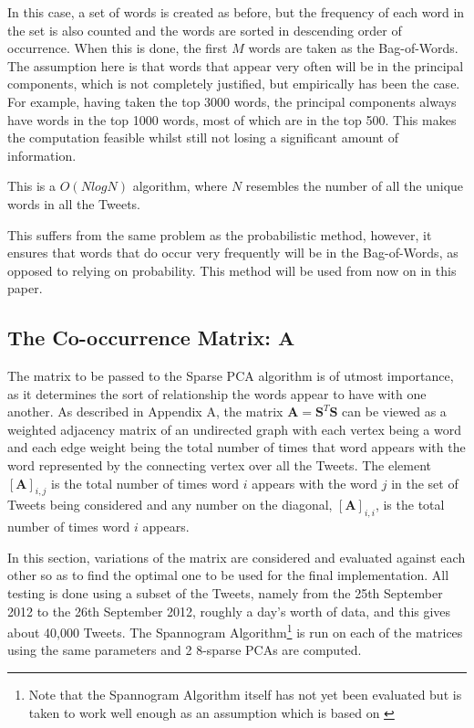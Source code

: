 \documentclass[11pt,a4paper]{article}
\newcommand{\covmat}{\mathbf{A}}
\begin{document}
In this case, a set of words is created as before, but the frequency of each word in the set is also counted and the words are sorted in descending order of occurrence. When this is done, the first $M$ words are taken as the Bag-of-Words. The assumption here is that words that appear very often will be in the principal components, which is not completely justified, but empirically has been the case. For example, having taken the top 3000 words, the principal components always have words in the top 1000 words, most of which are in the top 500. This makes the computation feasible whilst still not losing a significant amount of information.

This is a $O(NlogN)$ algorithm, where $N$ resembles the number of all the unique words in all the Tweets. 

This suffers from the same problem as the probabilistic method, however, it ensures that words that do occur very frequently will be in the Bag-of-Words, as opposed to relying on probability. This method will be used from now on in this paper.

\subsection{The Co-occurrence Matrix: $\mathbf{A}$}
\label{covmat}
The matrix to be passed to the Sparse PCA algorithm is of utmost importance, as it determines the sort of relationship the words appear to have with one another. As described in Appendix A, the matrix $\mathbf{A} = \mathbf{S}^T \mathbf{S}$ can be viewed as a weighted adjacency matrix of an undirected graph with each vertex being a word and each edge weight being the total number of times that word appears with the word represented by the connecting vertex over all the Tweets. The element $[\covmat]_{i, j}$ is the total number of times word $i$ appears with the word $j$ in the set of Tweets being considered and any number on the diagonal, $[\covmat]_{i, i}$, is the total number of times word $i$ appears. 

In this section, variations of the matrix are considered and evaluated against each other so as to find the optimal one to be used for the final implementation. All testing is done using a subset of the Tweets, namely from the 25th September 2012 to the 26th September 2012, roughly a day's worth of data, and this gives about 40,000 Tweets. The Spannogram Algorithm\footnote{Note that the Spannogram Algorithm itself has not yet been evaluated but is taken to work well enough as an assumption which is based on \cite{dimakis}} is run on each of the matrices using the same parameters and 2 8-sparse PCAs are computed.
\end{document}
